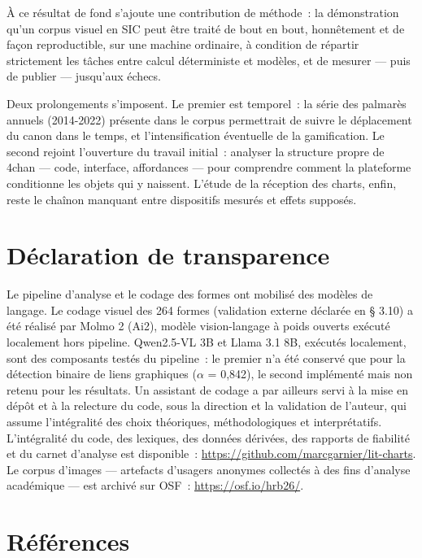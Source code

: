 \documentclass[11pt,a4paper]{article}
\begin{document}
À ce résultat de fond s'ajoute une contribution de méthode~: la démonstration qu'un corpus visuel en SIC peut être traité de bout en bout, honnêtement et de façon reproductible, sur une machine ordinaire, à condition de répartir strictement les tâches entre calcul déterministe et modèles, et de mesurer --- puis de publier --- jusqu'aux échecs.

Deux prolongements s'imposent. Le premier est temporel~: la série des palmarès annuels (2014-2022) présente dans le corpus permettrait de suivre le déplacement du canon dans le temps, et l'intensification éventuelle de la gamification. Le second rejoint l'ouverture du travail initial~: analyser la structure propre de 4chan --- code, interface, affordances --- pour comprendre comment la plateforme conditionne les objets qui y naissent. L'étude de la réception des charts, enfin, reste le chaînon manquant entre dispositifs mesurés et effets supposés.

\section*{Déclaration de transparence}

Le pipeline d'analyse et le codage des formes ont mobilisé des modèles de langage. Le codage visuel des 264 formes (validation externe déclarée en § 3.10) a été réalisé par Molmo 2 (Ai2), modèle vision-langage à poids ouverts exécuté localement hors pipeline. Qwen2.5-VL 3B et Llama 3.1 8B, exécutés localement, sont des composants testés du pipeline~: le premier n'a été conservé que pour la détection binaire de liens graphiques ($\alpha$ = 0,842), le second implémenté mais non retenu pour les résultats. Un assistant de codage a par ailleurs servi à la mise en dépôt et à la relecture du code, sous la direction et la validation de l'auteur, qui assume l'intégralité des choix théoriques, méthodologiques et interprétatifs. L'intégralité du code, des lexiques, des données dérivées, des rapports de fiabilité et du carnet d'analyse est disponible~: \url{https://github.com/marcgarnier/lit-charts}. Le corpus d'images --- artefacts d'usagers anonymes collectés à des fins d'analyse académique --- est archivé sur OSF~: \url{https://osf.io/hrb26/}.

\section*{Références}\small\setlength{\parindent}{-1.2em}\setlength{\leftskip}{1.2em}
\end{document}
